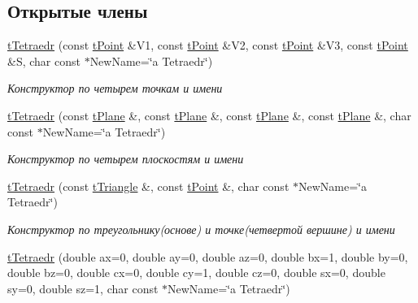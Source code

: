 \subsection*{Открытые члены}
\begin{DoxyCompactItemize}
\item 
\mbox{\label{classtTetraedr_ae16c310b01dbd8381503cf3610a9953e}} 
\hyperlink{classtTetraedr_ae16c310b01dbd8381503cf3610a9953e}{t\+Tetraedr} (const \hyperlink{classtPoint}{t\+Point} \&V1, const \hyperlink{classtPoint}{t\+Point} \&V2, const \hyperlink{classtPoint}{t\+Point} \&V3, const \hyperlink{classtPoint}{t\+Point} \&S, char const $\ast$New\+Name=\char`\"{}a Tetraedr\char`\"{})
\begin{DoxyCompactList}\small\item\em Конструктор по четырем точкам и имени \end{DoxyCompactList}\item 
\mbox{\label{classtTetraedr_ad276c51eebadada75b0e1a014421e426}} 
\hyperlink{classtTetraedr_ad276c51eebadada75b0e1a014421e426}{t\+Tetraedr} (const \hyperlink{classtPlane}{t\+Plane} \&, const \hyperlink{classtPlane}{t\+Plane} \&, const \hyperlink{classtPlane}{t\+Plane} \&, const \hyperlink{classtPlane}{t\+Plane} \&, char const $\ast$New\+Name=\char`\"{}a Tetraedr\char`\"{})
\begin{DoxyCompactList}\small\item\em Конструктор по четырем плоскостям и имени \end{DoxyCompactList}\item 
\mbox{\label{classtTetraedr_aef32a93d0050137e7bd1fff3688a830b}} 
\hyperlink{classtTetraedr_aef32a93d0050137e7bd1fff3688a830b}{t\+Tetraedr} (const \hyperlink{classtTriangle}{t\+Triangle} \&, const \hyperlink{classtPoint}{t\+Point} \&, char const $\ast$New\+Name=\char`\"{}a Tetraedr\char`\"{})
\begin{DoxyCompactList}\small\item\em Конструктор по треугольнику(основе) и точке(четвертой вершине) и имени \end{DoxyCompactList}\item 
\mbox{\label{classtTetraedr_a244165229504fe41e8ee386b6fdafc39}} 
\hyperlink{classtTetraedr_a244165229504fe41e8ee386b6fdafc39}{t\+Tetraedr} (double ax=0, double ay=0, double az=0, double bx=1, double by=0, double bz=0, double cx=0, double cy=1, double cz=0, double sx=0, double sy=0, double sz=1, char const $\ast$New\+Name=\char`\"{}a Tetraedr\char`\"{})

\end{DoxyCompactItemize}
